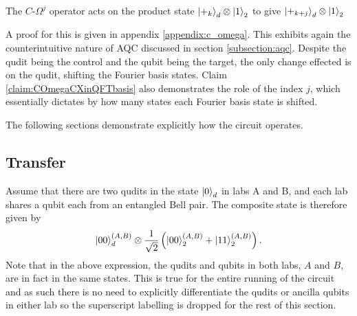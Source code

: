\begin{claim}
    \label{claim:COmegaCXinQFTbasis}
    The $C\text{-}\Omega^j$ operator acts on the product state $\ket{+_k}_d\otimes\ket{1}_2$ to give $\ket{+_{k+j}}_d\otimes\ket{1}_2$
\end{claim}
A proof for this is given in appendix \ref{appendix:c_omega}.
This exhibits again the counterintuitive nature of AQC discussed in section \ref{subsection:aqc}.
Despite the qudit being the control and the qubit being the target, the only change effected is on the qudit, shifting the Fourier basis states.
Claim \ref{claim:COmegaCXinQFTbasis} also demonstrates the role of the index $j$, which essentially dictates by how many states each Fourier basis state is shifted.

The following sections demonstrate explicitly how the circuit operates.

\subsection{Transfer}
\label{subsection:aqctransfer}
Assume that there are two qudits in the state $\ket{0}_d$ in labs A and B, and each lab shares a qubit each from an entangled Bell pair. The composite state is therefore given by
\begin{equation}
    \ket{00}_d^{(A,B)}\otimes\frac{1}{\sqrt{2}}\left(\ket{00}^{(A,B)}_2 + \ket{11}^{(A,B)}_2\right).
\end{equation}
Note that in the above expression, the qudits and qubits in both labs, $A$ and $B$, are in fact in the same states.
This is true for the entire running of the circuit and as such there is no need to explicitly differentiate the qudits or ancilla qubits in either lab so the superscript labelling is dropped for the rest of this section.

